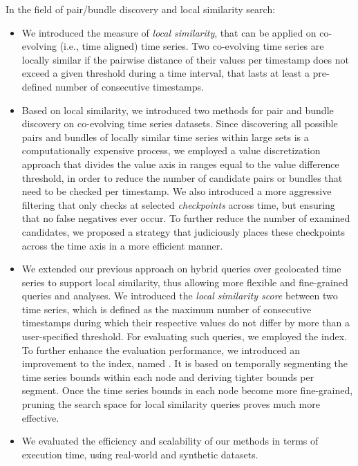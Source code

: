 In the field of pair/bundle discovery and local similarity search:
\begin{itemize}
	\item We introduced the measure of \textit{local similarity}, that can be applied on co-evolving (i.e., time aligned) time series. Two co-evolving time series are locally similar if the pairwise distance of their values per timestamp does not exceed a given threshold during a time interval, that lasts at least a pre-defined number of consecutive timestamps.
	\item Based on local similarity, we introduced two methods for pair and bundle discovery on co-evolving time series datasets. Since discovering all possible pairs and bundles of locally similar time series within large sets is a computationally expensive process, we employed a value discretization approach that divides the value axis in ranges equal to the value difference threshold, in order to reduce the number of candidate pairs or bundles that need to be checked per timestamp. We also introduced a more aggressive filtering that only checks at selected \textit{checkpoints} across time, but ensuring that no false negatives ever occur. To further reduce the number of examined candidates, we proposed a strategy that judiciously places these checkpoints across the time axis in a more efficient manner.
	\item We extended our previous approach on hybrid queries over geolocated time series to support local similarity, thus allowing more flexible and fine-grained queries and analyses. We introduced the \textit{local similarity score} between two time series, which is defined as the maximum number of consecutive timestamps during which their respective values do not differ by more than a user-specified threshold. For evaluating such queries, we employed the \btsr index. To further enhance the evaluation performance, we introduced an improvement to the \btsr index, named \sbtsr. It is based on temporally segmenting the time series bounds within each node and deriving tighter bounds per segment. Once the time series bounds in each node become more fine-grained, pruning the search space for local similarity queries proves much more effective.
	\item We evaluated the efficiency and scalability of our methods in terms of execution time, using real-world and synthetic datasets.
\end{itemize}

